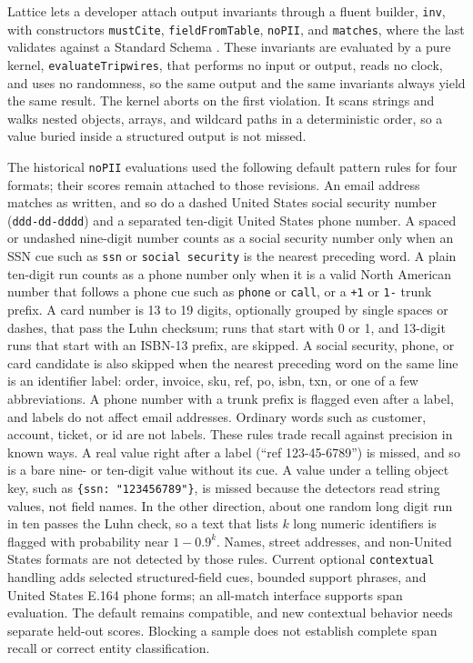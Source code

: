 \documentclass[conference]{IEEEtran}
\newcommand{\code}[1]{\texttt{\small #1}}
\begin{document}
Lattice lets a developer attach output invariants through a fluent builder,
\code{inv}, with constructors \code{mustCite}, \code{fieldFromTable}, \code{noPII},
and \code{matches}, where the last validates against a Standard Schema
\cite{standardschema}. These invariants are evaluated by a pure kernel,
\code{evaluateTripwires}, that performs no input or output, reads no clock, and uses
no randomness, so the same output and the same invariants always yield the same
result. The kernel aborts on the first violation. It scans strings and walks nested
objects, arrays, and wildcard paths in a deterministic order, so a value buried inside
a structured output is not missed.

The historical \code{noPII} evaluations used the following default pattern rules for
four formats; their scores remain attached to those revisions. An email
address matches as written, and so do a dashed United States social security number
(\code{ddd-dd-dddd}) and a separated ten-digit United States phone number. A spaced or
undashed nine-digit number counts as a social security number only when an SSN cue
such as \code{ssn} or \code{social security} is the nearest preceding word. A plain
ten-digit run counts as a phone number only when it is a valid North American number
that follows a phone cue such as \code{phone} or \code{call}, or a \code{+1} or
\code{1-} trunk prefix. A card number is 13 to 19 digits, optionally grouped by
single spaces or dashes, that pass the Luhn checksum; runs that start with 0 or 1, and 13-digit runs
that start with an ISBN-13 prefix, are skipped. A social security, phone, or card
candidate is also skipped when the nearest preceding word on the same line is an
identifier label: order, invoice, sku, ref, po, isbn, txn, or one of a few
abbreviations. A phone number with a trunk prefix is flagged even after a label, and
labels do not affect email addresses. Ordinary words such as customer,
account, ticket, or id are not labels. These rules trade recall against precision in
known ways. A real value right after a label (``ref 123-45-6789'') is missed, and so is
a bare nine- or ten-digit value without its cue. A value under a telling object key,
such as \code{\{ssn: "123456789"\}}, is missed because the detectors read string values,
not field names. In the other direction, about one random long digit run in ten passes
the Luhn check, so a text that lists $k$ long numeric identifiers is flagged with
probability near $1-0.9^k$. Names, street addresses, and non-United States formats are
not detected by those rules. Current optional \code{contextual} handling adds selected
structured-field cues, bounded support phrases, and United States E.164 phone forms;
an all-match interface supports span evaluation. The default remains compatible, and
new contextual behavior needs separate held-out scores. Blocking a sample does not
establish complete span recall or correct entity classification.
\end{document}
